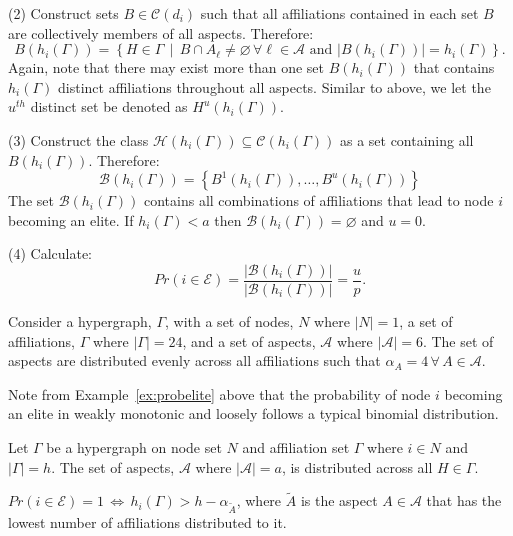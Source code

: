 \begin{subappendices}
\begin{abet}
\item[(2)] Construct sets $B \in \mathcal{C}(d_{i})$ such that all affiliations contained in each set $B$ are collectively members of all aspects. Therefore:
\[
B(h_{i}(\Gamma)) = \left\{ H \in \Gamma \, \mid \, B \cap A_{\ell} \neq \varnothing \, \forall \ell \in \mathcal{A} \mbox{ and } | B (h_{i}(\Gamma)) | = h_{i}(\Gamma) \right\} .
\]
Again, note that there may exist more than one set $B(h_{i}(\Gamma))$ that contains $h_{i}(\Gamma)$ distinct affiliations throughout all aspects. Similar to above, we let the $u^{th}$ distinct set be denoted as $H^{u}(h_{i}(\Gamma))$.

\item[(3)] Construct the class $\mathcal{H}(h_{i}(\Gamma)) \subseteq \mathcal{C}(h_{i}(\Gamma))$ as a set containing all $B(h_{i}(\Gamma))$. Therefore:
\[
\mathcal{B}(h_{i}(\Gamma)) = \left\{ B^{1}(h_{i}(\Gamma)), \ldots, B^{u}(h_{i}(\Gamma)) \right\}
\]
The set $\mathcal{B}(h_{i}(\Gamma))$ contains all combinations of affiliations that lead to node $i$ becoming an elite. If $h_{i}(\Gamma) < a$ then $\mathcal{B}(h_{i}(\Gamma)) = \varnothing$ and $u = 0$.

\item[(4)] Calculate:
\[
Pr(i \in \mathcal{E}) = \frac{ | \mathcal{B}(h_{i}(\Gamma)) |}{ | \mathcal{B}(h_{i}(\Gamma)) |} = \frac{u}{p} .
\]
\end{abet}

\begin{example} \label{ex:probelite}
Consider a hypergraph, $\Gamma$, with a set of nodes, $N$ where $|N| = 1$, a set of affiliations, $\Gamma$ where $| \Gamma | = 24$, and a set of aspects, $\mathcal{A}$ where $|\mathcal{A}| = 6$. The set of aspects are distributed evenly across all affiliations such that $\alpha_{A} = 4 \, \forall \, A \in \mathcal{A}$.
\end{example}

Note from Example~\ref{ex:probelite} above that the probability of node $i$ becoming an elite in weakly monotonic and loosely follows a typical binomial distribution.

\begin{proposition} \label{bounds}
Let $\Gamma$ be a hypergraph on node set $N$ and affiliation set $\Gamma$ where $i \in N$ and $|\Gamma| = h$. The set of aspects, $\mathcal{A}$ where $|\mathcal{A}| = a$, is distributed across all $H \in \Gamma$.

\begin{abet}
\item $Pr(i \in \mathcal{E}) = 1 \, \iff \, h_{i}(\Gamma) > h - \alpha_{\tilde{A}}$, where $\tilde{A}$ is the aspect $A \in \mathcal{A}$ that has the lowest number of affiliations distributed to it.


\end{abet}
\end{proposition}
\end{subappendices}
